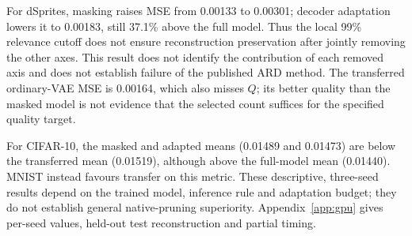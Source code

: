 For dSprites, masking raises MSE from 0.00133 to 0.00301; decoder
adaptation lowers it to 0.00183, still 37.1\% above the full model.
Thus the local 99\% relevance cutoff does not ensure reconstruction
preservation after jointly removing the other axes. This result does
not identify the contribution of each removed axis and does not
establish failure of the published ARD method. The transferred
ordinary-VAE MSE is 0.00164, which also misses $Q$; its better quality
than the masked model is not evidence that the selected count suffices
for the specified quality target.

For CIFAR-10, the masked and adapted means (0.01489 and 0.01473)
are below the transferred mean (0.01519), although above the full-model
mean (0.01440). MNIST instead favours transfer on this metric.
These descriptive, three-seed results depend on the trained model,
inference rule and adaptation budget; they do not establish general
native-pruning superiority. Appendix~\ref{app:gpu} gives per-seed
values, held-out test reconstruction and partial timing.
